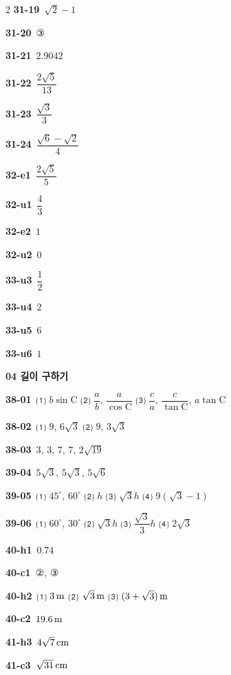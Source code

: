 \documentclass[10pt,a4paper]{article}
\newcommand{\pt}[1]{\mathrm{#1}}
\begin{document}
\begin{multicols}{2}
\noindent\textbf{31-19}\ $\sqrt{2}-1$\par
\noindent\textbf{31-20}\ ③\par
\noindent\textbf{31-21}\ $2.9042$\par
\noindent\textbf{31-22}\ $\dfrac{2\sqrt{5}}{13}$\par
\noindent\textbf{31-23}\ $\dfrac{\sqrt{3}}{3}$\par
\noindent\textbf{31-24}\ $\dfrac{\sqrt{6}-\sqrt{2}}{4}$\par
\noindent\textbf{32-e1}\ $\dfrac{2\sqrt{5}}{5}$\par
\noindent\textbf{32-u1}\ $\dfrac{4}{3}$\par
\noindent\textbf{32-e2}\ $1$\par
\noindent\textbf{32-u2}\ $0$\par
\noindent\textbf{33-u3}\ $\dfrac{1}{2}$\par
\noindent\textbf{33-u4}\ $2$\par
\noindent\textbf{33-u5}\ $6$\par
\noindent\textbf{33-u6}\ $1$\par
\noindent\textbf{04 길이 구하기}\par\smallskip
\noindent\textbf{38-01}\ ⑴ $b\sin\pt{C}$ ⑵ $\dfrac{a}{b}$, $\dfrac{a}{\cos\pt{C}}$ ⑶ $\dfrac{c}{a}$, $\dfrac{c}{\tan\pt{C}}$, $a\tan\pt{C}$\par
\noindent\textbf{38-02}\ ⑴ $9$, $6\sqrt{3}$ ⑵ $9$, $3\sqrt{3}$\par
\noindent\textbf{38-03}\ $3$, $3$, $7$, $7$, $2\sqrt{19}$\par
\noindent\textbf{39-04}\ $5\sqrt{3}$, $5\sqrt{3}$, $5\sqrt{6}$\par
\noindent\textbf{39-05}\ ⑴ $45^\circ$, $60^\circ$ ⑵ $h$ ⑶ $\sqrt{3}h$ ⑷ $9(\sqrt{3}-1)$\par
\noindent\textbf{39-06}\ ⑴ $60^\circ$, $30^\circ$ ⑵ $\sqrt{3}h$ ⑶ $\dfrac{\sqrt{3}}{3}h$ ⑷ $2\sqrt{3}$\par
\noindent\textbf{40-h1}\ $0.74$\par
\noindent\textbf{40-c1}\ ②, ③\par
\noindent\textbf{40-h2}\ ⑴ $3\mkern3mu \mathrm{m}$ ⑵ $\sqrt{3}\mkern3mu \mathrm{m}$ ⑶ $(3+\sqrt{3})\mkern3mu \mathrm{m}$\par
\noindent\textbf{40-c2}\ $19.6\mkern3mu \mathrm{m}$\par
\noindent\textbf{41-h3}\ $4\sqrt{7}\mkern3mu \mathrm{cm}$\par
\noindent\textbf{41-c3}\ $\sqrt{31}\mkern3mu \mathrm{cm}$\par

\end{multicols}
\end{document}
